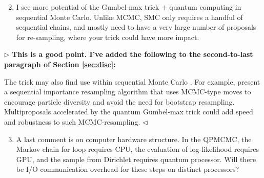 \documentclass[12pt]{article}
\newenvironment{reply}{$\triangleright$\bfseries}{$\triangleleft$}
\renewenvironment{quote}
               {\list{}{\rightmargin\leftmargin}%
                \item\relax\normalfont}
               {\endlist}
\begin{document}
	
\begin{enumerate}
	  \setcounter{enumi}{1}
	\item I see more potential of the Gumbel-max trick $+$ quantum computing in sequential Monte Carlo. Unlike MCMC, SMC only requires a handful of sequential chains, and mostly need to have a very large number of proposals for re-sampling, where your trick could have more impact.
\end{enumerate}

\begin{reply}
	This is a good point.  I've added the following to the second-to-last paragraph of Section \ref{sec:disc}:
	\begin{quote}
		The trick may also find use within sequential Monte Carlo \citep{doucet2001sequential}.  For example, \citet{berzuini2001resample} present a sequential importance resampling algorithm that uses MCMC-type moves to encourage particle diversity and avoid the need for bootstrap resampling.  Multiproposals accelerated by the quantum Gumbel-max trick could add speed and robustness to such MCMC-resampling.
	\end{quote}	
\end{reply}

\begin{enumerate}
	  \setcounter{enumi}{2}
	\item A last comment is on computer hardware structure. In the QPMCMC, the Markov chain for loop requires CPU, the evaluation of log-likelihood requires GPU, and the sample from Dirichlet requires quantum processor. Will there be I/O communication overhead for these steps on distinct processors?
\end{enumerate}
\end{document}
